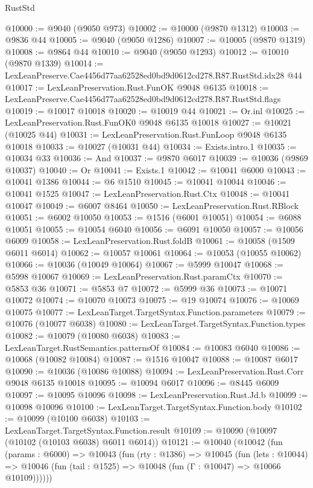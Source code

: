 \begin{lexlean}{RustStd}
\begin{coremodule}
{{@10000 := @9040 (@9050 @973)
@10002 := @10000 (@9870 @1312)
@10003 := @9836 @44
@10005 := @9040 (@9050 @1286)
@10007 := @10005 (@9870 @1319)
@10008 := @9864 @44
@10010 := @9040 (@9050 @1293)
@10012 := @10010 (@9870 @1339)
@10014 := LexLeanPreserve.Cae4456d77aa62528ed0bd9d0612cd278.R87.RustStd.idx28 @44
@10017 := LexLeanPreservation.Rust.FunOK @9048 @6135
@10018 := LexLeanPreserve.Cae4456d77aa62528ed0bd9d0612cd278.R87.RustStd.flags
@10019 := @10017 @10018
@10020 := @10019 @44
@10021 := Or.inl
@10025 := LexLeanPreservation.Rust.FunOK0 @9048 @6135 @10018
@10027 := @10021 (@10025 @44)
@10031 := LexLeanPreservation.Rust.FunLoop @9048 @6135 @10018
@10033 := @10027 (@10031 @44)
@10034 := Exists.intro.{1}
@10035 := @10034 @33
@10036 := And
@10037 := @9870 @6017
@10039 := @10036 (@9869 @10037)
@10040 := Or
@10041 := Exists.{1}
@10042 := @10041 @6000
@10043 := @10041 @1386
@10044 := @6 @1510
@10045 := @10041 @10044
@10046 := @10041 @1525
@10047 := LexLeanPreservation.Rust.Ctx
@10048 := @10041 @10047
@10049 := @6007 @8464
@10050 := LexLeanPreservation.Rust.RBlock
@10051 := @6002 @10050
@10053 := @1516 (@6001 @10051)
@10054 := @6088 @10051
@10055 := @10054 @6040
@10056 := @6091 @10050
@10057 := @10056 @6009
@10058 := LexLeanPreservation.Rust.foldB
@10061 := @10058 (@1509 @6011 @6014)
@10062 := @10057 @10061
@10064 := @10053 (@10055 @10062)
@10066 := @10036 (@10049 @10064)
@10067 := @5999 @10047
@10068 := @5998 @10067
@10069 := LexLeanPreservation.Rust.paramCtx
@10070 := @5853 @36
@10071 := @5853 @7
@10072 := @5999 @36
@10073 := @10071 @10072
@10074 := @10070 @10073
@10075 := @19 @10074
@10076 := @10069 @10075
@10077 := LexLeanTarget.TargetSyntax.Function.parameters
@10079 := @10076 (@10077 @6038)
@10080 := LexLeanTarget.TargetSyntax.Function.types
@10082 := @10079 (@10080 @6038)
@10083 := LexLeanTarget.RustSemantics.patternsOf
@10084 := @10083 @6040
@10086 := @10068 (@10082 @10084)
@10087 := @1516 @10047
@10088 := @10087 @6017
@10090 := @10036 (@10086 @10088)
@10094 := LexLeanPreservation.Rust.Corr @9048 @6135 @10018
@10095 := @10094 @6017
@10096 := @8445 @6009
@10097 := @10095 @10096
@10098 := LexLeanPreservation.Rust.Jd.b
@10099 := @10098 @10096
@10100 := LexLeanTarget.TargetSyntax.Function.body
@10102 := @10099 (@10100 @6038)
@10103 := LexLeanTarget.TargetSyntax.Function.result
@10109 := @10090 (@10097 (@10102 (@10103 @6038) @6011 @6014))
@10121 := @10040
    (@10042
      (fun (params : @6000) =>
      @10043
        (fun (rty : @1386) =>
        @10045
          (fun (lets : @10044) =>
          @10046 (fun (tail : @1525) => @10048 (fun (Γ : @10047) => @10066 @10109))))))
}}
\end{coremodule}
\end{lexlean}
